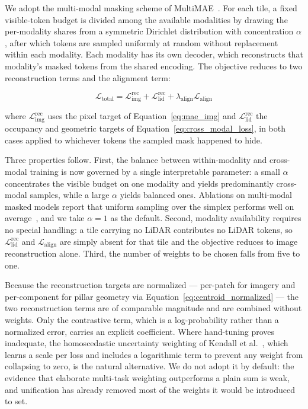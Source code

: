 \documentclass{book}
\begin{document}
We adopt the multi-modal masking scheme of
MultiMAE~\cite{bachmann2022multimae}.  For each tile, a fixed
visible-token budget is divided among the available modalities by
drawing the per-modality shares from a symmetric Dirichlet
distribution with concentration $\alpha$, after which tokens are
sampled uniformly at random without replacement within each
modality.  Each modality has its own decoder, which reconstructs
that modality's masked tokens from the shared encoding.  The
objective reduces to two reconstruction terms and the alignment
term:

\begin{equation}
  \mathcal{L}_{\text{total}} =
    \mathcal{L}^{\text{rec}}_{\text{img}}
    + \mathcal{L}^{\text{rec}}_{\text{lid}}
    + \lambda_{\text{align}} \mathcal{L}_{\text{align}}
  \label{eq:total_loss}
\end{equation}

where $\mathcal{L}^{\text{rec}}_{\text{img}}$ uses the pixel
target of Equation~\eqref{eq:mae_img} and
$\mathcal{L}^{\text{rec}}_{\text{lid}}$ the occupancy and
geometric targets of
Equation~\eqref{eq:cross_modal_loss}, in both cases applied to
whichever tokens the sampled mask happened to hide.

Three properties follow.  First, the balance between
within-modality and cross-modal training is now governed by a
single interpretable parameter: a small $\alpha$ concentrates the
visible budget on one modality and yields predominantly
cross-modal samples, while a large $\alpha$ yields balanced ones.
Ablations on multi-modal masked models report that uniform
sampling over the simplex performs well on
average~\cite{mizrahi20234m}, and we take $\alpha = 1$ as the
default.  Second, modality availability requires no special
handling: a tile carrying no LiDAR contributes no LiDAR tokens,
so $\mathcal{L}^{\text{rec}}_{\text{lid}}$ and
$\mathcal{L}_{\text{align}}$ are simply absent for that tile and
the objective reduces to image reconstruction alone.  Third, the
number of weights to be chosen falls from five to one.

Because the reconstruction targets are normalized ---
per-patch for imagery and per-component for pillar geometry via
Equation~\eqref{eq:centroid_normalized} --- the two reconstruction
terms are of comparable magnitude and are combined without
weights.  Only the contrastive term, which is a log-probability
rather than a normalized error, carries an explicit coefficient.
Where hand-tuning proves inadequate, the homoscedastic
uncertainty weighting of Kendall et
al.~\cite{kendall2018multitask}, which learns a scale per loss and
includes a logarithmic term to prevent any weight from collapsing
to zero, is the natural alternative.  We do not adopt it by
default: the evidence that elaborate multi-task weighting
outperforms a plain sum is weak, and unification has already
removed most of the weights it would be introduced to set.
\end{document}
